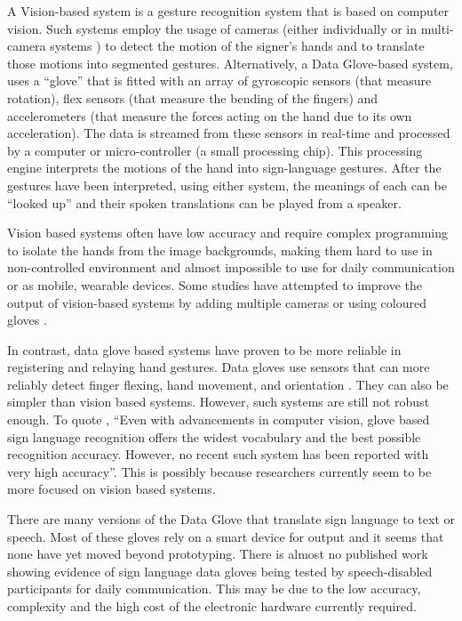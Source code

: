 A Vision-based system is a gesture recognition system that is based on computer vision. Such systems employ the usage of cameras (either individually or in multi-camera systems \parencite{Vogler1998}) to detect the motion of the signer's hands and to translate those motions into segmented gestures. Alternatively, a Data Glove-based system, uses a ``glove'' that is fitted with an array of gyroscopic sensors (that measure rotation), flex sensors (that measure the bending of the fingers) and accelerometers (that measure the forces acting on the hand due to its own acceleration). The data is streamed from these sensors in real-time and processed by a computer or micro-controller (a small processing chip). This processing engine interprets the motions of the hand into sign-language gestures. After the gestures have been interpreted, using either system, the meanings of each can be ``looked up'' and their spoken translations can be played from a speaker.

Vision based systems often have low accuracy and require complex programming to isolate the hands from the image backgrounds, making them hard to use in non-controlled environment and almost impossible to use for daily communication or as mobile, wearable devices. Some studies have attempted to improve the output of vision-based systems by adding multiple cameras \parencite{Vogler1998} or using coloured gloves \parencite{Starner1998}.

In contrast, data glove based systems have proven to be more reliable in registering and relaying hand gestures. Data gloves use sensors that can more reliably detect finger flexing, hand movement, and orientation \parencite{AnethaK2014}. They can also be simpler than vision based systems. However, such systems are still not robust enough. To quote \citeauthor{Premaratne2010}, ``Even with advancements in computer vision, glove based sign language recognition offers the widest vocabulary and the best possible recognition accuracy. However, no recent such system has been reported with very high accuracy''. This is possibly because researchers currently seem to be more focused on vision based systems.

There are many versions of the Data Glove that translate sign language to text or speech. Most of these gloves rely on a smart device for output and it seems that none have yet moved beyond prototyping. There is almost no published work showing evidence of sign language data gloves being tested by speech-disabled participants for daily communication. This may be due to the low accuracy, complexity and the high cost of the electronic hardware currently required.

